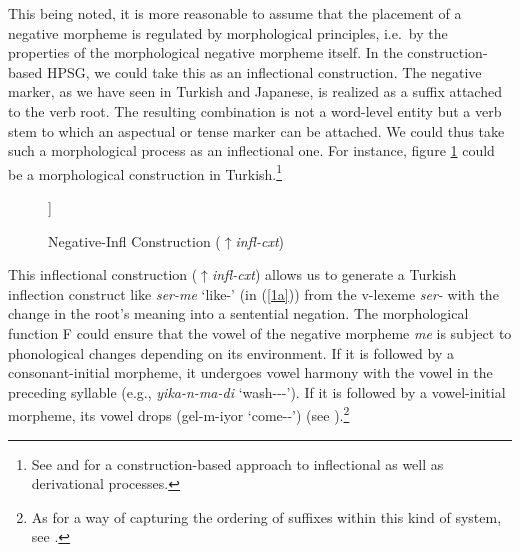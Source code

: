 \documentclass[output=paper]{langsci/langscibook}
\begin{document}
{This being noted, it is more reasonable to assume that the placement of a
negative morpheme is regulated by morphological principles, i.e.\ by
the properties of the morphological negative morpheme itself. In the
construction-based HPSG, we could take this as an inflectional
construction.  The negative marker, as we have seen in Turkish and Japanese, is realized as a suffix
attached to the verb root. The resulting combination is not
a word-level entity but a verb stem to which an aspectual or tense marker can be attached. We could thus take such a morphological process as an inflectional
one. For instance, figure \ref{fig:2} could be a morphological
construction in Turkish.\footnote{See
\citet{Sag:12} and \citet{Hilpert:16} for a construction-based approach to
inflectional as well as derivational processes.}



\begin{figure}[h!]
	\centering	
	\begin{forest}
		[
		\begin{avm}
			\[\tpv{v-neg-stem}\\
			form  \< \textbf{F}\textsubscript{NEG} (X)\>\\
			syn|head|pos  \tpv{verb}\\
			sem \[frames \< \[\tpv{neg-fr}\\
			arg \@{1} \] \>
			\]
			\]	
		\end{avm}
		[
		\begin{avm}
			\[ \tpv{v-lxm}\\
			form  \< X \>\\
			syn|head|pos  \tpv{verb}\\
			sem \[frames  \<\@{1} \> \] 
			\]
		\end{avm}
		]
		]
	\end{forest}
	\caption{Negative-Infl Construction ($\uparrow$\emph{infl-cxt})}\label{fig:2}
\end{figure}	


%
This inflectional construction ($\uparrow${\it infl-cxt}) allows us to generate a Turkish inflection construct like {\it ser-me} `like-\NEG' (in (\ref{1a})) from the v-lexeme {\it ser-} with the change in the root's meaning into a sentential negation. The morphological function F could ensure that the vowel of the negative morpheme {\it me} is subject to phonological changes depending on its environment. If it is followed by a consonant-initial morpheme, it undergoes vowel harmony with the vowel in the preceding syllable (e.g., {\it yika-n-ma-di} `wash-\REFL-\NEG-\PST'). If it is followed by a vowel-initial morpheme, its vowel drops (gel-m-iyor `come-\NEG-\PROG') (see \citet{kelepir}).\footnote{As
 for a way of capturing the ordering of suffixes within this kind of system,
 see \citet{Kim:16}.}


}
\end{document}
